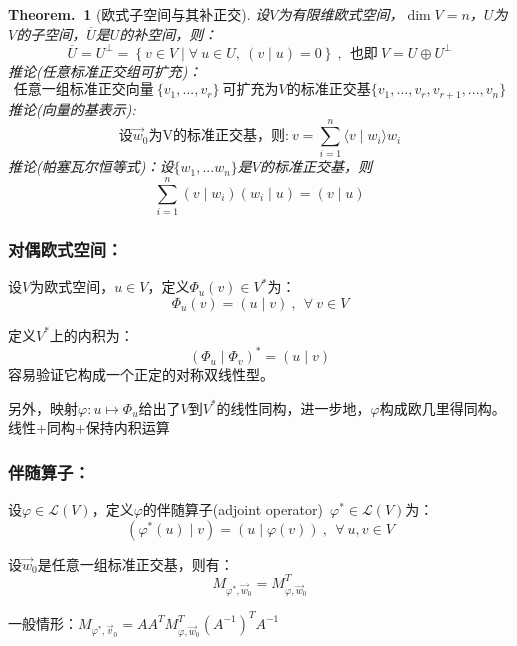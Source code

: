 \documentclass[zihao=5,UTF8]{report}
\theoremstyle{mystyle} %
\newtheorem{theorem}{Theorem.\,}
\begin{document}
\begin{theorem}[欧式子空间与其补正交]\label{欧式子空间与其补正交}
    设$V$为有限维欧式空间，$\dim V = n$，$U$为$V$的子空间，$\overline{U}$是$U$的补空间，则：
    \begin{equation*}
        \overline{U} = U^{\perp} = \left\{ v \in V\mid \forall \ u \in U,\ (v\mid u) = 0 \right\}\ ,\ \ \text{也即}\ V = U \oplus U^{\perp}
    \end{equation*}
    推论(任意标准正交组可扩充)：
    \begin{equation*}
        \text{任意一组标准正交向量}\ \{v_1,...,v_r \}\ \text{可扩充为$V$的标准正交基}\{v_1,...,v_r,v_{r+1},...,v_n \}
    \end{equation*}
    推论(向量的基表示): 
\begin{equation*}
    \text{设$\vec{w}_0$为V的标准正交基，则:}\ v = \sum_{i=1}^{n}\langle v \mid w_i \rangle w_i
\end{equation*}  
    推论(帕塞瓦尔恒等式)：设$\{w_1,...w_n \}$是$V$的标准正交基，则
    \begin{equation*}
        \sum_{i=1}^{n}(v\mid w_i)(w_i\mid u) = (v\mid u)
    \end{equation*}
\end{theorem}
\subsubsection{对偶欧式空间：}
设$V$为欧式空间，$u \in V$，定义$\varPhi_u(v) \in V^*$为：
\begin{equation*}
    \varPhi_u(v) = (u\mid v)\ ,\ \ \forall\ v \in V
\end{equation*}\par
定义$V^*$上的内积为：
\begin{equation*}
    (\varPhi_u \mid \varPhi_v)^* = (u\mid v)
\end{equation*}
{\color{gray}\small 容易验证它构成一个正定的对称双线性型。}\par
另外，映射$\varphi: u \longmapsto \varPhi_u$给出了$V$到$V^*$的线性同构，进一步地，$\varphi$构成欧几里得同构。{\color{gray}\small 线性+同构+保持内积运算}\par

\subsubsection{伴随算子：}
设$\varphi \in \mathscr{L}(V)$，定义$\varphi$的伴随算子(adjoint operator)\ $\varphi^* \in \mathscr{L}(V)$为：
\begin{equation*}
    \left(\varphi^*(u)\mid v\right) = (u\mid \varphi(v))\ ,\ \ \forall\ u,v \in V
\end{equation*}\par
设$\vec{w}_0$是任意一组标准正交基，则有：
\begin{equation*}
    M_{\varphi^*,\vec{w}_0} = M_{\varphi,\vec{w}_0}^T
\end{equation*}
{\par\color{gray}\small
一般情形：$M_{\varphi^*,\vec{v}_0} = AA^TM_{\varphi,\vec{w}_0}^T (A^{-1})^TA^{-1}$
\par}
\end{document}
